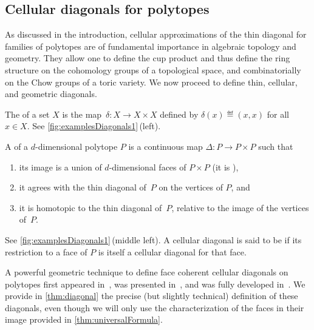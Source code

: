 
\subsection{Cellular diagonals for polytopes}
\label{subsec:cellularDiagonalsPolytopes}
 
As discussed in the introduction, cellular approximations of the thin diagonal for families of polytopes are of fundamental importance in algebraic topology and geometry.
They allow one to define the cup product and thus define the ring structure on the cohomology groups of a topological space, and combinatorially on the Chow groups of a toric variety. 
We now proceed to define thin, cellular, and geometric diagonals.

\begin{definition} 
\label{def:thinDiagonal}
The  of a set $X$ is the map~$\delta : X \to X \times X$ defined by $\delta(x) \eqdef (x,x)$ for all $x \in X$.
See \cref{fig:examplesDiagonals1}\,(left).
\end{definition}

\begin{definition} 
\label{def:cellularDiagonal}
A  of a $d$-dimensional polytope $P$ is a continuous map ${\Delta : P \to P \times P}$ such that
\begin{enumerate}
\item its image is a union of $d$-dimensional faces of $P\times P$ (\ie it is ),
\item it agrees with the thin diagonal of~$P$ on the vertices of $P$, and
\item it is homotopic to the thin diagonal of~$P$, relative to the image of the vertices of~$P$. 
\end{enumerate}
See \cref{fig:examplesDiagonals1}\,(middle left).
A cellular diagonal is said to be  if its restriction to a face of $P$ is itself a cellular diagonal for that face. 
\end{definition}

A powerful geometric technique to define face coherent cellular diagonals on polytopes first appeared in~\cite{FultonSturmfels}, was presented in~\cite{MasudaThomasTonksVallette}, and was fully developed in~\cite{LaplanteAnfossi}.
We provide in \cref{thm:diagonal} the precise (but slightly technical) definition of these diagonals, even though we will only use the characterization of the faces in their image provided in \cref{thm:universalFormula}.

